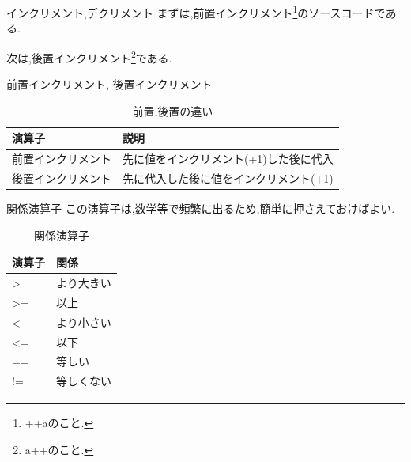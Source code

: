 \begin{frame}{インクリメント,デクリメント}
    まずは,前置インクリメント\footnote{++aのこと.}のソースコードである.
    \begin{minipage}{\linewidth}
        
    \end{minipage}

    次は,後置インクリメント\footnote{a++のこと.}である.
    \begin{minipage}{\linewidth}
        
    \end{minipage}
\end{frame}

\begin{frame}{前置インクリメント, 後置インクリメント}
\begin{table}[]
    \centering
    \begin{tabular}{|l|l|}
    \hline
        演算子 & 説明\\
        \hline
       前置インクリメント  & 先に値をインクリメント(+1)した後に代入 \\
       後置インクリメント  & 先に代入した後に値をインクリメント(+1)\\
       \hline
    \end{tabular}
    \caption{前置,後置の違い}
    \label{tab:my_label}
\end{table}
    
\end{frame}

\begin{frame}{関係演算子}
この演算子は,数学等で頻繁に出るため,簡単に押さえておけばよい.
    \begin{table}[]
        \centering
        \begin{tabular}{|l|l|}
        \hline
        演算子 & 関係\\
        \hline
        > & より大きい\\
        >= & 以上\\
        < & より小さい\\
        <= & 以下\\
        == & 等しい\\
        != & 等しくない\\
        \hline
        \end{tabular}
        \caption{関係演算子}
        \label{tab:my_label}
    \end{table}
\end{frame}

